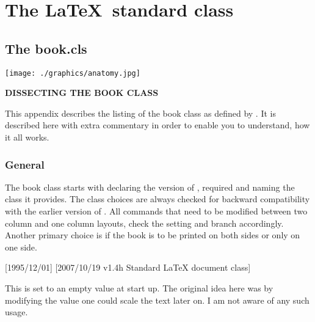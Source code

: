 \part{The \LaTeX\ standard class}
\parindent0pt
\setlength\columnsep{2em}
\def\Paragraph#1{{\bf #1}\quad}
\chapter{The book.cls}

\clearpage

\texttt{[image: ./graphics/anatomy.jpg]}

\vspace{2\baselineskip}

\textbf{\Large DISSECTING THE BOOK CLASS}
\thispagestyle{plain}
\begin{multicols}{2}
This appendix describes the listing of the book class as defined by \latex. It is described here with extra commentary in order to enable you to understand, how it all works.

\lipsum[1-3]
\end{multicols}

\section{General}
\pagestyle{headings}

The book class starts with declaring the version of \latex, required
and naming the class it provides. The class choices are always checked for backward compatibility with the earlier version of \latex. All commands that need to be modified between two column and one column layouts, check the setting and branch accordingly. Another primary choice is if the book is to be printed on both sides or only on one side.


\begin{teX}
[1995/12/01]
              [2007/10/19 v1.4h
 Standard LaTeX document class]
\end{teX}

\begin{macro}{}
This is set to an empty value at start up. The original idea here was by modifying the value one could scale the
text later on. I am not aware of any such usage.
\end{macro}

\begin{teX}
\newcommand\@ptsize{}
\newif\if@restonecol
\newif\if@titlepage \@titlepagetrue
\newif\if@openright
\newif\if@mainmatter \@mainmattertrue
\end{teX}



